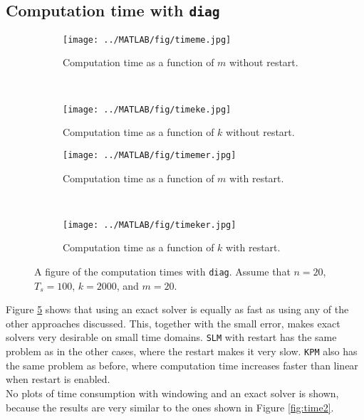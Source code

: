 \subsection{Computation time with \texttt{diag}}
\begin{figure}[H]
        \centering
        \begin{subfigure}[b]{0.3\textwidth}
                \texttt{[image: ../MATLAB/fig/timeme.jpg]}
                \caption{ Computation time as a function of $m$ without restart. }
                \label{fig:timeme}
        \end{subfigure}
        ~
        \begin{subfigure}[b]{0.3\textwidth}
                \texttt{[image: ../MATLAB/fig/timeke.jpg]}
                \caption{ Computation time as a function of $k$ without restart. }
                \label{fig:timeke}
        \end{subfigure}
        
        \begin{subfigure}[b]{0.3\textwidth}
                \texttt{[image: ../MATLAB/fig/timemer.jpg]}
                \caption{ Computation time as a function of $m$ with restart. }
                \label{fig:timemer}
        \end{subfigure}
        ~
        \begin{subfigure}[b]{0.3\textwidth}
                \texttt{[image: ../MATLAB/fig/timeker.jpg]}
                \caption{ Computation time as a function of $k$ with restart. }
                \label{fig:timeker}
        \end{subfigure}
        \caption{ A figure of the computation times with \texttt{diag}. Assume that $n = 20$, $T_s = 100$, $k = 2000$, and $m = 20$. }
        \label{fig:time3}
\end{figure}
Figure \ref{fig:time3} shows that using an exact solver is equally as fast as using any of the other approaches discussed. This, together with the small error, makes exact solvers very desirable on small time domains. \texttt{SLM} with restart has the same problem as in the other cases, where the restart makes it very slow. \texttt{KPM} also has the same problem as before, where computation time increases faster than linear when restart is enabled. \\

\noindent No plots of time consumption with windowing and an exact solver is shown, because the results are very similar to the ones shown in Figure \ref{fig:time2}. 